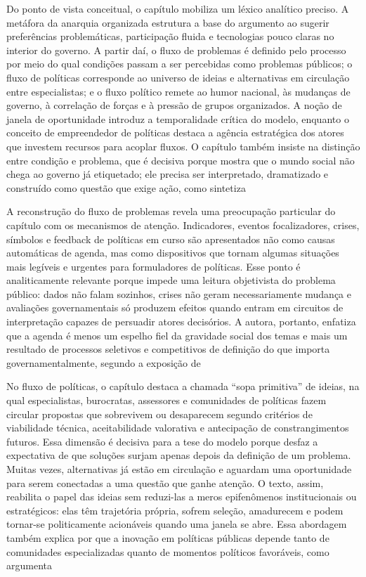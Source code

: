 \documentclass[12pt,a4paper]{article}
\begin{document}
Do ponto de vista conceitual, o capítulo mobiliza um léxico analítico preciso. A metáfora da anarquia organizada estrutura a base do argumento ao sugerir preferências problemáticas, participação fluida e tecnologias pouco claras no interior do governo. A partir daí, o fluxo de problemas é definido pelo processo por meio do qual condições passam a ser percebidas como problemas públicos; o fluxo de políticas corresponde ao universo de ideias e alternativas em circulação entre especialistas; e o fluxo político remete ao humor nacional, às mudanças de governo, à correlação de forças e à pressão de grupos organizados. A noção de janela de oportunidade introduz a temporalidade crítica do modelo, enquanto o conceito de empreendedor de políticas destaca a agência estratégica dos atores que investem recursos para acoplar fluxos. O capítulo também insiste na distinção entre condição e problema, que é decisiva porque mostra que o mundo social não chega ao governo já etiquetado; ele precisa ser interpretado, dramatizado e construído como questão que exige ação, como sintetiza\parencite{brasil2022_abordagens_contemporaneas}

A reconstrução do fluxo de problemas revela uma preocupação particular do capítulo com os mecanismos de atenção. Indicadores, eventos focalizadores, crises, símbolos e feedback de políticas em curso são apresentados não como causas automáticas de agenda, mas como dispositivos que tornam algumas situações mais legíveis e urgentes para formuladores de políticas. Esse ponto é analiticamente relevante porque impede uma leitura objetivista do problema público: dados não falam sozinhos, crises não geram necessariamente mudança e avaliações governamentais só produzem efeitos quando entram em circuitos de interpretação capazes de persuadir atores decisórios. A autora, portanto, enfatiza que a agenda é menos um espelho fiel da gravidade social dos temas e mais um resultado de processos seletivos e competitivos de definição do que importa governamentalmente, segundo a exposição de\parencite{brasil2022_abordagens_contemporaneas}

No fluxo de políticas, o capítulo destaca a chamada “sopa primitiva” de ideias, na qual especialistas, burocratas, assessores e comunidades de políticas fazem circular propostas que sobrevivem ou desaparecem segundo critérios de viabilidade técnica, aceitabilidade valorativa e antecipação de constrangimentos futuros. Essa dimensão é decisiva para a tese do modelo porque desfaz a expectativa de que soluções surjam apenas depois da definição de um problema. Muitas vezes, alternativas já estão em circulação e aguardam uma oportunidade para serem conectadas a uma questão que ganhe atenção. O texto, assim, reabilita o papel das ideias sem reduzi-las a meros epifenômenos institucionais ou estratégicos: elas têm trajetória própria, sofrem seleção, amadurecem e podem tornar-se politicamente acionáveis quando uma janela se abre. Essa abordagem também explica por que a inovação em políticas públicas depende tanto de comunidades especializadas quanto de momentos políticos favoráveis, como argumenta\parencite{brasil2022_abordagens_contemporaneas}
\end{document}
